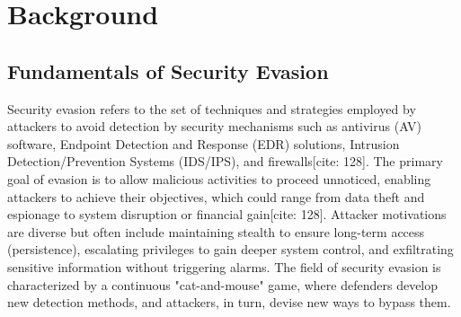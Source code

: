 \documentclass[11pt]{article}
\begin{document}
	\section{Background}
	\subsection{Fundamentals of Security Evasion}
	Security evasion refers to the set of techniques and strategies employed by attackers to avoid detection by security mechanisms such as antivirus (AV) software, Endpoint Detection and Response (EDR) solutions, Intrusion Detection/Prevention Systems (IDS/IPS), and firewalls[cite: 128]. The primary goal of evasion is to allow malicious activities to proceed unnoticed, enabling attackers to achieve their objectives, which could range from data theft and espionage to system disruption or financial gain[cite: 128]. Attacker motivations are diverse but often include maintaining stealth to ensure long-term access (persistence), escalating privileges to gain deeper system control, and exfiltrating sensitive information without triggering alarms. The field of security evasion is characterized by a continuous "cat-and-mouse" game, where defenders develop new detection methods, and attackers, in turn, devise new ways to bypass them.
	
\end{document}
